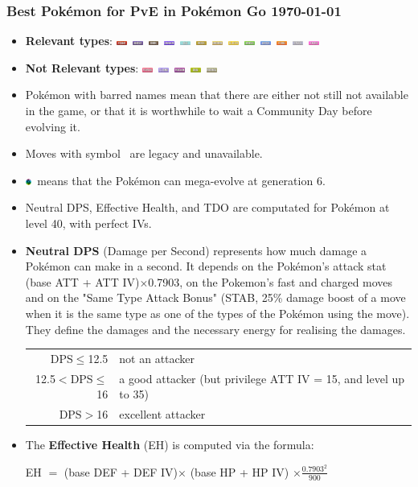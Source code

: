 \documentclass[compress]{beamer}
\newcommand{\fightingfull}{\includegraphics[height=0.15cm]{../../images/type/full/Fighting.png}}
\newcommand{\bugfull}{\includegraphics[height=0.15cm]{../../images/type/full/Bug.png}}
\newcommand{\darkfull}{\includegraphics[height=0.15cm]{../../images/type/full/Dark.png}}
\newcommand{\electricfull}{\includegraphics[height=0.15cm]{../../images/type/full/Electric.png}}
\newcommand{\fairyfull}{\includegraphics[height=0.15cm]{../../images/type/full/Fairy.png}}
\newcommand{\firefull}{\includegraphics[height=0.15cm]{../../images/type/full/Fire.png}}
\newcommand{\flyingfull}{\includegraphics[height=0.15cm]{../../images/type/full/Flying.png}}
\newcommand{\ghostfull}{\includegraphics[height=0.15cm]{../../images/type/full/Ghost.png}}
\newcommand{\dragonfull}{\includegraphics[height=0.15cm]{../../images/type/full/Dragon.png}}
\newcommand{\grassfull}{\includegraphics[height=0.15cm]{../../images/type/full/Grass.png}}
\newcommand{\groundfull}{\includegraphics[height=0.15cm]{../../images/type/full/Ground.png}}
\newcommand{\icefull}{\includegraphics[height=0.15cm]{../../images/type/full/Ice.png}}
\newcommand{\normalfull}{\includegraphics[height=0.15cm]{../../images/type/full/Normal.png}}
\newcommand{\psychicfull}{\includegraphics[height=0.15cm]{../../images/type/full/Psychic.png}}
\newcommand{\rockfull}{\includegraphics[height=0.15cm]{../../images/type/full/Rock.png}}
\newcommand{\waterfull}{\includegraphics[height=0.15cm]{../../images/type/full/Water.png}}
\newcommand{\poisonfull}{\includegraphics[height=0.15cm]{../../images/type/full/Poison.png}}
\newcommand{\steelfull}{\includegraphics[height=0.15cm]{../../images/type/full/Steel.png}}
\newcommand{\megaevol}{\includegraphics[width=0.2cm]{../../images/megaevolve}}
\begin{document}
\begin{frame}
\frametitle{Best Pok\'emon for PvE in Pok\'emon Go \hspace{8cm} \today}

\begin{block}{}
\begin{large}
\begin{itemize}
  \item \textbf{Relevant types}: \fightingfull ~\ghostfull ~\darkfull ~\dragonfull ~\icefull ~\rockfull ~\groundfull ~\electricfull ~\grassfull ~\waterfull ~\firefull ~\steelfull ~\fairyfull 
 \item \textbf{Not Relevant types}:  \psychicfull ~\flyingfull ~\poisonfull ~\bugfull ~\normalfull
  \item Pok\'emon with barred names mean that there are either not still not available in the game, or that it is worthwhile to wait a Community Day before evolving it.
  \item Moves with symbol \dag~are legacy and unavailable.
  \item \megaevol~means that the Pok\'emon can mega-evolve at generation 6.
  \item Neutral DPS, Effective Health, and TDO are computated for Pok\'emon at level 40, with perfect IVs. 
  \item \textbf{Neutral DPS} (Damage per Second) represents how much damage a Pok\'emon can make in a second. It depends on the Pok\'emon's attack stat (base ATT + ATT IV)$\times$0.7903, on the Pokemon's fast and charged moves and on the "Same Type Attack Bonus" (STAB, 25\% damage boost of a move when it is the same type as one of the types of the Pokémon using the move). They define the damages and the necessary energy for realising the damages.
\begin{center}
\begin{tabular}{rl}
DPS$\leq$12.5   &  not an attacker  \\
12.5$<$DPS$\leq$16   &  a good attacker (but privilege ATT IV = 15, and level up to 35)  \\
DPS$>$16   &  excellent attacker  \\
\end{tabular}
\end{center}
  \item The \textbf{Effective Health} (EH) is computed via the formula:
\begin{center}
EH $=$ (base DEF + DEF IV)$\times$ (base HP + HP IV) $\times \frac{0.7903^2}{900}$
\end{center}

\end{itemize}
\end{large}
\end{block}
\end{frame}
\end{document}

